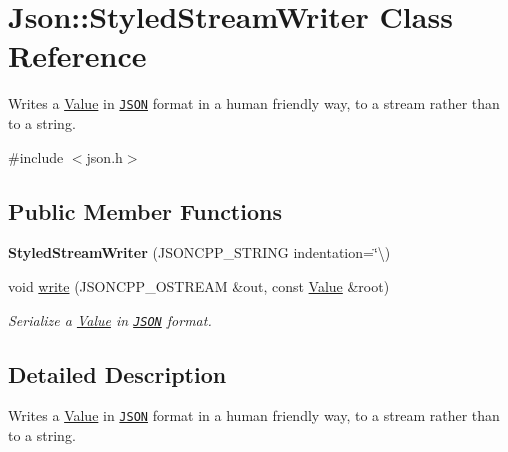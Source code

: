 \hypertarget{classJson_1_1StyledStreamWriter}{}\section{Json\+:\+:Styled\+Stream\+Writer Class Reference}
\label{classJson_1_1StyledStreamWriter}


Writes a \hyperlink{classJson_1_1Value}{Value} in \href{http://www.json.org}{\tt J\+S\+ON} format in a human friendly way, to a stream rather than to a string.  




{\ttfamily \#include $<$json.\+h$>$}

\subsection*{Public Member Functions}
\begin{DoxyCompactItemize}
\item 
{\bfseries Styled\+Stream\+Writer} (J\+S\+O\+N\+C\+P\+P\+\_\+\+S\+T\+R\+I\+NG indentation=\char`\"{}\textbackslash{})\hypertarget{classJson_1_1StyledStreamWriter_a5e41c4e40f11266046bd0ea8f8f5a75e}{}\label{classJson_1_1StyledStreamWriter_a5e41c4e40f11266046bd0ea8f8f5a75e}

\item 
void \hyperlink{classJson_1_1StyledStreamWriter_a5d89d984fe675641e42c4370cd247774}{write} (J\+S\+O\+N\+C\+P\+P\+\_\+\+O\+S\+T\+R\+E\+AM \&out, const \hyperlink{classJson_1_1Value}{Value} \&root)
\begin{DoxyCompactList}\small\item\em Serialize a \hyperlink{classJson_1_1Value}{Value} in \href{http://www.json.org}{\tt J\+S\+ON} format. \end{DoxyCompactList}\end{DoxyCompactItemize}


\subsection{Detailed Description}
Writes a \hyperlink{classJson_1_1Value}{Value} in \href{http://www.json.org}{\tt J\+S\+ON} format in a human friendly way, to a stream rather than to a string. 


